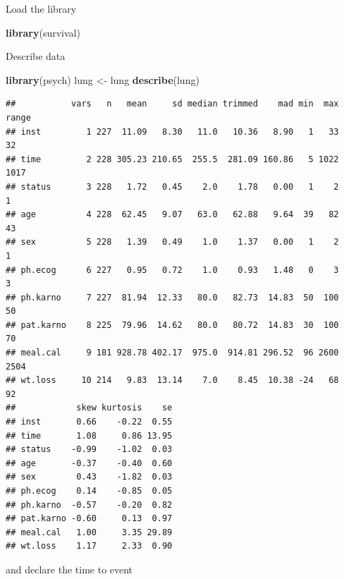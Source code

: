 \documentclass[]{book}
\newenvironment{Shaded}{\begin{snugshade}}{\end{snugshade}}
\newcommand{\KeywordTok}[1]{\textcolor[rgb]{0.13,0.29,0.53}{\textbf{#1}}}
\newcommand{\DataTypeTok}[1]{\textcolor[rgb]{0.13,0.29,0.53}{#1}}
\newcommand{\DecValTok}[1]{\textcolor[rgb]{0.00,0.00,0.81}{#1}}
\newcommand{\StringTok}[1]{\textcolor[rgb]{0.31,0.60,0.02}{#1}}
\newcommand{\OperatorTok}[1]{\textcolor[rgb]{0.81,0.36,0.00}{\textbf{#1}}}
\newcommand{\NormalTok}[1]{#1}
\theoremstyle{definition}
\theoremstyle{definition}
\theoremstyle{remark}
\begin{document}
Load the library

\begin{Shaded}
\begin{Highlighting}[]
\KeywordTok{library}\NormalTok{(survival)}
\end{Highlighting}
\end{Shaded}

Describe data

\begin{Shaded}
\begin{Highlighting}[]
\KeywordTok{library}\NormalTok{(psych)}
\NormalTok{lung <-}\StringTok{ }\NormalTok{lung}
\KeywordTok{describe}\NormalTok{(lung)}
\end{Highlighting}
\end{Shaded}

\begin{verbatim}
##           vars   n   mean     sd median trimmed    mad min  max range
## inst         1 227  11.09   8.30   11.0   10.36   8.90   1   33    32
## time         2 228 305.23 210.65  255.5  281.09 160.86   5 1022  1017
## status       3 228   1.72   0.45    2.0    1.78   0.00   1    2     1
## age          4 228  62.45   9.07   63.0   62.88   9.64  39   82    43
## sex          5 228   1.39   0.49    1.0    1.37   0.00   1    2     1
## ph.ecog      6 227   0.95   0.72    1.0    0.93   1.48   0    3     3
## ph.karno     7 227  81.94  12.33   80.0   82.73  14.83  50  100    50
## pat.karno    8 225  79.96  14.62   80.0   80.72  14.83  30  100    70
## meal.cal     9 181 928.78 402.17  975.0  914.81 296.52  96 2600  2504
## wt.loss     10 214   9.83  13.14    7.0    8.45  10.38 -24   68    92
##            skew kurtosis    se
## inst       0.66    -0.22  0.55
## time       1.08     0.86 13.95
## status    -0.99    -1.02  0.03
## age       -0.37    -0.40  0.60
## sex        0.43    -1.82  0.03
## ph.ecog    0.14    -0.85  0.05
## ph.karno  -0.57    -0.20  0.82
## pat.karno -0.60     0.13  0.97
## meal.cal   1.00     3.35 29.89
## wt.loss    1.17     2.33  0.90
\end{verbatim}

and declare the time to event

\begin{Shaded}
\end{Shaded}
\end{document}
